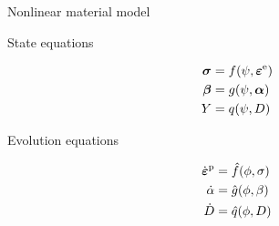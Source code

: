 { \begin{block}{ \centering Nonlinear material model}
 \end{block}
 \vspace{-0.5cm}
 \begin{minipage}[t]{0.4\textwidth}
  \begin{itemize}
   {\item State equations}
         \centering
         \vspace{-0.3cm}
         \begin{equation*}
          \begin{split}
           \mbox{\boldmath $\sigma$} &=f({\psi,\mbox{\boldmath $\varepsilon $}^{\rm{e}}}) \\
           \mbox{\boldmath $\beta$} &= g({\psi,\mbox{\boldmath $\alpha$}})\\
           Y &=q({\psi,D})
          \end{split}
         \end{equation*}
  \end{itemize}
 \end{minipage}\hfil\begin{minipage}[t]{0.5\textwidth}
  \begin{itemize}
   {\item Evolution equations}
         \centering
         \vspace{-0.3cm}
         \begin{equation*}
          \begin{split}
           {\dot{\mbox{\boldmath $\varepsilon $}}}^{\rm p} &= \hat{f}({\phi,\sigma})\\
           {\dot\alpha} &=\hat{g}({\phi,\beta}) \\
           {\dot{D}} &= \hat{q}({\phi,D})
          \end{split}
         \end{equation*}
  \end{itemize}
 \end{minipage}

}
